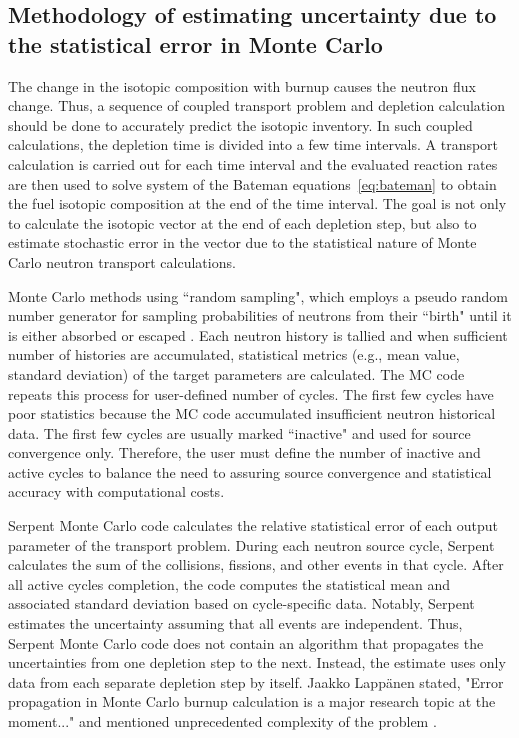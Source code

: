 \subsection{Methodology of estimating uncertainty due to the statistical error 
in Monte Carlo}
The change in the isotopic composition with burnup causes the neutron flux 
change. Thus, a sequence of coupled transport problem and depletion 
calculation should be done to accurately predict the isotopic inventory. In 
such coupled calculations, the depletion time is divided into a few time 
intervals. A transport calculation is carried out for each time interval and 
the evaluated reaction rates are then used to solve system of the Bateman 
equations~\ref{eq:bateman} to obtain the fuel isotopic composition at the end 
of the time interval. The goal is not only to calculate the isotopic vector at 
the end of each depletion step, but also to estimate stochastic error in the 
vector due to the statistical nature of Monte Carlo neutron transport 
calculations.

Monte Carlo methods using ``random sampling", which employs a pseudo random 
number generator for sampling probabilities of neutrons from their ``birth" 
until it is either absorbed or escaped \cite{brown_fundamentals_2005}. Each 
neutron history is tallied and when sufficient number of histories are 
accumulated, statistical metrics (e.g., mean value, standard deviation) of the 
target parameters are calculated. The \gls{MC} code repeats this process for 
user-defined number of cycles. The first few cycles have poor statistics 
because the \gls{MC} code accumulated insufficient neutron historical data. 
The first few cycles are usually marked ``inactive" and used for source 
convergence only. Therefore, the user must define the number of inactive and 
active cycles to balance the need to assuring source convergence and 
statistical accuracy with computational costs.

Serpent Monte Carlo code calculates the relative statistical error of each 
output parameter of the transport problem. 
During each neutron source cycle, Serpent calculates the sum of the 
collisions, fissions, and other events in that cycle. After all active cycles 
completion, the code computes the statistical mean and associated standard 
deviation based on cycle-specific data. Notably, Serpent estimates the 
uncertainty assuming that all events are independent. Thus, Serpent Monte 
Carlo code does not contain an algorithm that propagates the uncertainties 
from one depletion step to the next. Instead, the estimate uses only data from 
each separate depletion step by itself. Jaakko Lapp\"{a}nen stated, "Error 
propagation in Monte Carlo burnup calculation is a major research topic at the 
moment..." and mentioned unprecedented complexity of the problem 
\cite{leppanen_statistical_2012}.


